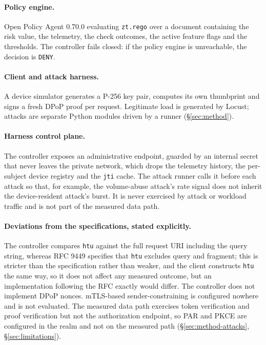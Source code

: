 \paragraph{Policy engine.} Open Policy Agent 0.70.0 evaluating \texttt{zt.rego} over a document containing the risk value, the telemetry, the check outcomes, the active feature flags and the thresholds. The controller fails closed: if the policy engine is unreachable, the decision is \texttt{DENY}.

\paragraph{Client and attack harness.} A device simulator generates a P-256 key pair, computes its own thumbprint and signs a fresh DPoP proof per request. Legitimate load is generated by Locust; attacks are separate Python modules driven by a runner (\S\ref{sec:method}).

\paragraph{Harness control plane.} The controller exposes an administrative endpoint, guarded by an internal secret that never leaves the private network, which drops the telemetry history, the per-subject device registry and the \texttt{jti} cache. The attack runner calls it before each attack so that, for example, the volume-abuse attack's rate signal does not inherit the device-resident attack's burst. It is never exercised by attack or workload traffic and is not part of the measured data path.

\paragraph{Deviations from the specifications, stated explicitly.} The controller compares \texttt{htu} against the full request URI including the query string, whereas RFC 9449 specifies that \texttt{htu} excludes query and fragment; this is stricter than the specification rather than weaker, and the client constructs \texttt{htu} the same way, so it does not affect any measured outcome, but an implementation following the RFC exactly would differ. The controller does not implement DPoP nonces. mTLS-based sender-constraining is configured nowhere and is not evaluated. The measured data path exercises token verification and proof verification but not the authorization endpoint, so PAR and PKCE are configured in the realm and not on the measured path (\S\ref{sec:method-attacks}, \S\ref{sec:limitations}).

